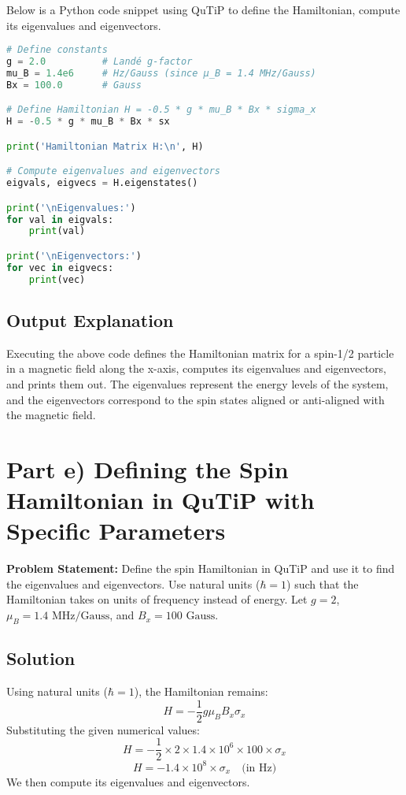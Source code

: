 \documentclass[12pt]{article}
\begin{document}
Below is a Python code snippet using QuTiP to define the Hamiltonian, compute its eigenvalues and eigenvectors.

\begin{lstlisting}[language=Python, caption=Evaluating the Spin Hamiltonian in QuTiP]
# Define constants
g = 2.0          # Landé g-factor
mu_B = 1.4e6     # Hz/Gauss (since μ_B = 1.4 MHz/Gauss)
Bx = 100.0       # Gauss

# Define Hamiltonian H = -0.5 * g * mu_B * Bx * sigma_x
H = -0.5 * g * mu_B * Bx * sx

print('Hamiltonian Matrix H:\n', H)

# Compute eigenvalues and eigenvectors
eigvals, eigvecs = H.eigenstates()

print('\nEigenvalues:')
for val in eigvals:
    print(val)

print('\nEigenvectors:')
for vec in eigvecs:
    print(vec)
\end{lstlisting}

\subsection{Output Explanation}

Executing the above code defines the Hamiltonian matrix for a spin-1/2 particle in a magnetic field along the x-axis, computes its eigenvalues and eigenvectors, and prints them out. The eigenvalues represent the energy levels of the system, and the eigenvectors correspond to the spin states aligned or anti-aligned with the magnetic field.

\newpage

\section{Part e) Defining the Spin Hamiltonian in QuTiP with Specific Parameters}

\textbf{Problem Statement:} Define the spin Hamiltonian in QuTiP and use it to find the eigenvalues and eigenvectors. Use natural units (\( \hbar = 1 \)) such that the Hamiltonian takes on units of frequency instead of energy. Let \( g = 2 \), \( \mu_B = 1.4 \text{ MHz/Gauss} \), and \( B_x = 100 \text{ Gauss} \).

\subsection{Solution}

Using natural units (\( \hbar = 1 \)), the Hamiltonian remains:
\[
H = -\frac{1}{2} g \mu_B B_x \sigma_x
\]
Substituting the given numerical values:
\[
H = -\frac{1}{2} \times 2 \times 1.4 \times 10^6 \times 100 \times \sigma_x
\]
\[
H = -1.4 \times 10^8 \times \sigma_x \quad \text{(in Hz)}
\]
We then compute its eigenvalues and eigenvectors.
\end{document}
